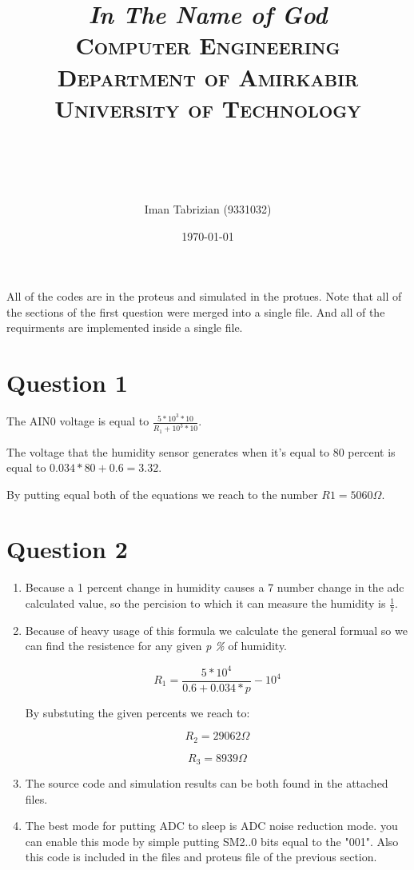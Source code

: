 \documentclass[paper=a4, fontsize=11pt]{scrartcl} %
\title{
\normalfont \normalsize
\textit{In The Name of God} \\ \textsc{Computer Engineering Department of Amirkabir University of Technology} \\ [25pt] \horrule{0.5pt} \\[0.4cm] %
\horrule{2pt} \\[0.5cm] %
}
\author{Iman Tabrizian (9331032)}
\date{\normalsize\today}
\numberwithin{equation}{section} %
\numberwithin{figure}{section} %
\numberwithin{table}{section} %
\begin{document}
\maketitle
\par All of the codes are in the proteus and simulated in the protues. Note that
all of the sections of the first question were merged into a single file. And all of
the requirments are implemented inside a single file.

\section{Question 1}
The AIN0 voltage is equal to $\frac{5 * 10 ^ 3 * 10}{R_1 + 10 ^ 3 * 10}$.

The voltage that the humidity sensor generates when it's equal to 80 percent
is equal to $0.034*80 + 0.6=3.32$.

By putting equal both of the equations we reach to the number $R1 = 5060 \Omega$.

\section{Question 2}
\begin{enumerate}
    \item
        Because a 1 percent change in humidity causes a 7 number change in the adc
        calculated value, so the percision to which it can measure the humidity is
        $\frac{1}{7}$.

    \item
        Because of heavy usage of this formula we calculate the general formual
        so we can find the resistence for any given \textit{p \%} of humidity.

        $$R_1=\frac{5*10^4}{0.6+0.034*p}-10^4$$

        By substuting the given percents we reach to:

        $$R_2 = 29062 \Omega$$

        $$R_3 = 8939 \Omega$$

    \item
        The source code and simulation results can be both found in the attached
        files.

    \item
        The best mode for putting ADC to sleep is ADC noise reduction mode.
        you can enable this mode by simple putting SM2..0 bits equal to the
        "001". Also this code is included in the files and proteus file of the
        previous section.





\end{enumerate}
\end{document}
